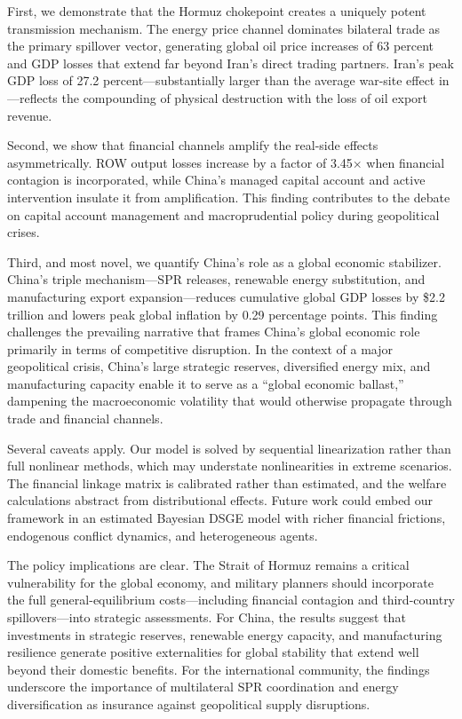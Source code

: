 \documentclass[12pt,a4paper]{article}
\begin{document}
First, we demonstrate that the Hormuz chokepoint creates a uniquely potent transmission mechanism. The energy price channel dominates bilateral trade as the primary spillover vector, generating global oil price increases of 63 percent and GDP losses that extend far beyond Iran's direct trading partners. Iran's peak GDP loss of 27.2 percent---substantially larger than the average war-site effect in \citeauthor{federle2026price}---reflects the compounding of physical destruction with the loss of oil export revenue.

Second, we show that financial channels amplify the real-side effects asymmetrically. ROW output losses increase by a factor of 3.45$\times$ when financial contagion is incorporated, while China's managed capital account and active intervention insulate it from amplification. This finding contributes to the debate on capital account management and macroprudential policy during geopolitical crises.

Third, and most novel, we quantify China's role as a global economic stabilizer. China's triple mechanism---SPR releases, renewable energy substitution, and manufacturing export expansion---reduces cumulative global GDP losses by \$2.2 trillion and lowers peak global inflation by 0.29 percentage points. This finding challenges the prevailing narrative that frames China's global economic role primarily in terms of competitive disruption. In the context of a major geopolitical crisis, China's large strategic reserves, diversified energy mix, and manufacturing capacity enable it to serve as a ``global economic ballast,'' dampening the macroeconomic volatility that would otherwise propagate through trade and financial channels.

Several caveats apply. Our model is solved by sequential linearization rather than full nonlinear methods, which may understate nonlinearities in extreme scenarios. The financial linkage matrix is calibrated rather than estimated, and the welfare calculations abstract from distributional effects. Future work could embed our framework in an estimated Bayesian DSGE model with richer financial frictions, endogenous conflict dynamics, and heterogeneous agents.

The policy implications are clear. The Strait of Hormuz remains a critical vulnerability for the global economy, and military planners should incorporate the full general-equilibrium costs---including financial contagion and third-country spillovers---into strategic assessments. For China, the results suggest that investments in strategic reserves, renewable energy capacity, and manufacturing resilience generate positive externalities for global stability that extend well beyond their domestic benefits. For the international community, the findings underscore the importance of multilateral SPR coordination and energy diversification as insurance against geopolitical supply disruptions.
\end{document}
